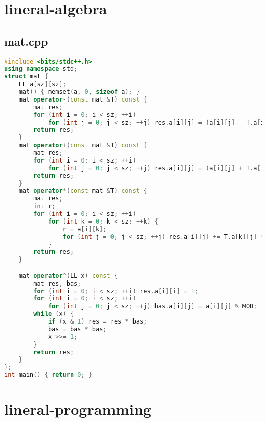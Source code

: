 \documentclass[9pt, a4paper, oneside]{book}
\begin{document}
\section{lineral-algebra}
\subsection{mat.cpp}
\begin{lstlisting}[language={C++}]
#include <bits/stdc++.h>
using namespace std;
struct mat {
    LL a[sz][sz];
    mat() { memset(a, 0, sizeof a); }
    mat operator-(const mat &T) const {
        mat res;
        for (int i = 0; i < sz; ++i)
            for (int j = 0; j < sz; ++j) res.a[i][j] = (a[i][j] - T.a[i][j]) % MOD;
        return res;
    }
    mat operator+(const mat &T) const {
        mat res;
        for (int i = 0; i < sz; ++i)
            for (int j = 0; j < sz; ++j) res.a[i][j] = (a[i][j] + T.a[i][j]) % MOD;
        return res;
    }
    mat operator*(const mat &T) const {
        mat res;
        int r;
        for (int i = 0; i < sz; ++i)
            for (int k = 0; k < sz; ++k) {
                r = a[i][k];
                for (int j = 0; j < sz; ++j) res.a[i][j] += T.a[k][j] * r, res.a[i][j] %= MOD;
            }
        return res;
    }

    mat operator^(LL x) const {
        mat res, bas;
        for (int i = 0; i < sz; ++i) res.a[i][i] = 1;
        for (int i = 0; i < sz; ++i)
            for (int j = 0; j < sz; ++j) bas.a[i][j] = a[i][j] % MOD;
        while (x) {
            if (x & 1) res = res * bas;
            bas = bas * bas;
            x >>= 1;
        }
        return res;
    }
};
int main() { return 0; }\end{lstlisting}
\section{lineral-programming}
\end{document}
